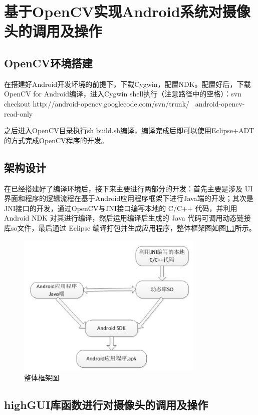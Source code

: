 \documentclass{XDBAthesis}
\begin{document}
\else
\fi
\chapter{基于OpenCV实现Android系统对摄像头的调用及操作}

\section{OpenCV环境搭建}

在搭建好Android开发坏境的前提下，下载Cygwin，配置NDK。配置好后，下载OpenCV for Android编译，进入Cygwin shell执行（注意路径中的空格）：svn checkout http://android-opencv.googlecode.com/svn/trunk/  android-opencv-read-only

    之后进入OpenCV目录执行sh build.sh编译，编译完成后即可以使用Eclipse+ADT的方式完成OpenCV程序的开发。

\section{架构设计}

    在已经搭建好了编译环境后，接下来主要进行两部分的开发：首先主要是涉及 UI 界面和程序的逻辑流程在基于Android应用程序框架下进行Java端的开发；其次是JNI接口的开发，通过OpenCV与JNI接口编写本地的 C/C++ 代码，并利用 Android NDK 对其进行编译，然后运用编译后生成的 Java 代码可调用动态链接库so文件，最后通过 Eclipse 编译打包并生成应用程序，整体框架图如图\ref{fg:whole}所示。
\begin{figure}[htb]
    \centering
    \includegraphics[width=0.8\textwidth]{figure/opencv}
    \caption{整体框架图}
    \label{fg:whole}
\end{figure}


\section{highGUI库函数进行对摄像头的调用及操作}
\end{document}
